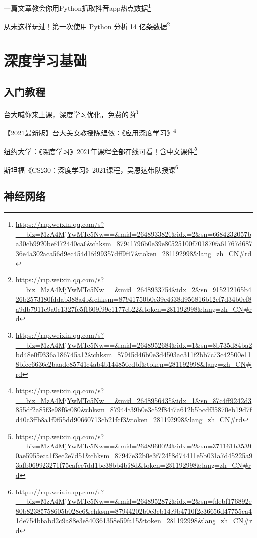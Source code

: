 \documentclass[]{ctexbook}
\renewcommand{\href}[2]{#2\footnote{\url{#1}}}
\begin{document}
\href{https://mp.weixin.qq.com/s?__biz=MzA4MjYwMTc5Nw==\&mid=2648933820\&idx=2\&sn=6684232057ba30cb9920bef472440ca6\&chksm=87941796b0e39e80525100f701870fa61767d68736e4a302aca56d9ec454d1fd99357dff9f47\&token=281192998\&lang=zh_CN\#rd}{一篇文章教会你用Python抓取抖音app热点数据}

\href{https://mp.weixin.qq.com/s?__biz=MzA4MjYwMTc5Nw==\&mid=2648933754\&idx=2\&sn=915212165b426b2573180fddab388a4b\&chksm=87941750b0e39e4638d956816b12cf7d34b0cf8a9db7911c9a0c1327fc5f1609f99e1177eb22\&token=281192998\&lang=zh_CN\#rd}{从未这样玩过！第一次使用 Python 分析 14 亿条数据}

\hypertarget{ux6df1ux5ea6ux5b66ux4e60ux57faux7840}{%
\chapter{深度学习基础}\label{ux6df1ux5ea6ux5b66ux4e60ux57faux7840}}

\hypertarget{ux5165ux95e8ux6559ux7a0b}{%
\section{入门教程}\label{ux5165ux95e8ux6559ux7a0b}}

\href{https://mp.weixin.qq.com/s?__biz=MzA4MjYwMTc5Nw==\&mid=2648952684\&idx=1\&sn=8b735d84ba2bd48e0f9336a186745a12\&chksm=87945d46b0e3d4503ac311f2bb7c73c42500e118bfcc6636c2baade85741c4ab4b144850edbf\&token=281192998\&lang=zh_CN\#rd}{台大喊你来上课，深度学习优化，免费的哟}

\href{https://mp.weixin.qq.com/s?__biz=MzA4MjYwMTc5Nw==\&mid=2648956435\&idx=1\&sn=87c4ff9242d3855df2a85f3e98f6c080\&chksm=87944c39b0e3c52f84c7a612b5bcdf35870eb19d7fd40c3ffb8a1f9f55dd90660713cb21fcf3\&token=281192998\&lang=zh_CN\#rd}{【2021最新版】台大美女教授陈缊侬：《应用深度学习》}

\href{https://mp.weixin.qq.com/s?__biz=MzA4MjYwMTc5Nw==\&mid=2648960024\&idx=2\&sn=371161b35390ae5955eca1f3ec2e7d51\&chksm=87947e32b0e3f72458d74411e5b031a7d45225a93afb069923271f75eafee7dd1bc38bb4b68d\&token=281192998\&lang=zh_CN\#rd}{纽约大学：《深度学习》2021年课程全部在线可看！含中文课件}

\href{https://mp.weixin.qq.com/s?__biz=MzA4MjYwMTc5Nw==\&mid=2648952872\&idx=2\&sn=fdebf176892e80b82385758605b028e6\&chksm=87944202b0e3cb14e9b4710f2c36656d47755ca41de754bbabd2c9a88e3e840361358e59fa15\&token=281192998\&lang=zh_CN\#rd}{斯坦福《CS230：深度学习》2021课程，吴恩达带队授课}

\hypertarget{ux795eux7ecfux7f51ux7edc}{%
\section{神经网络}\label{ux795eux7ecfux7f51ux7edc}}
\end{document}
